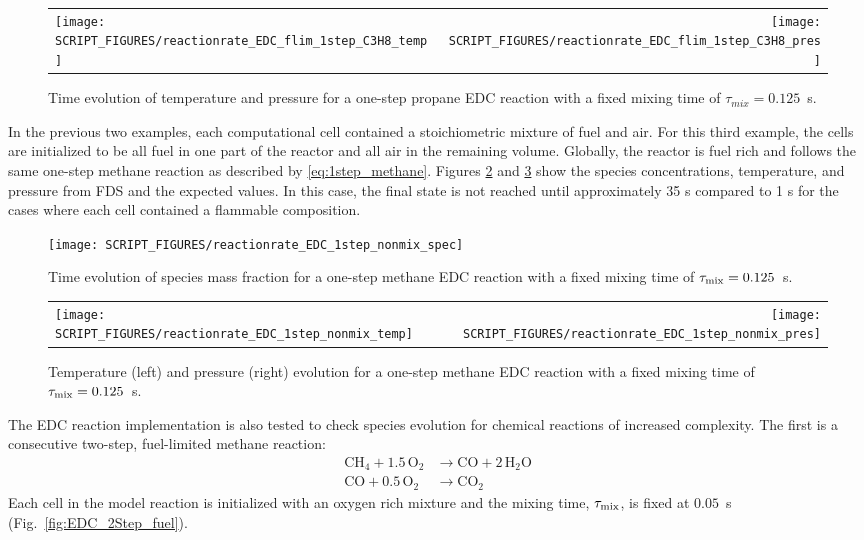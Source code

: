 \documentclass[11pt]{book}
\begin{document}
\begin{figure}[!ht]
\begin{tabular*}{\textwidth}{lr}
\texttt{[image: SCRIPT\_FIGURES/reactionrate\_EDC\_flim\_1step\_C3H8\_temp]} &
\texttt{[image: SCRIPT\_FIGURES/reactionrate\_EDC\_flim\_1step\_C3H8\_pres]}
\end{tabular*}
\caption[Temperature and pressure evolution in a 1-step propane EDC reaction]{Time evolution of temperature and pressure for a one-step propane EDC reaction with a fixed mixing time of $\tau_{mix}=0.125$~s.}
\label{fig:EDC_1Step_prop_temppres}
\end{figure}

In the previous two examples, each computational cell contained a stoichiometric mixture of fuel and air. For this third example, the cells are initialized to be all fuel in one part of the reactor and all air in the remaining volume. Globally, the reactor is fuel rich and follows the same one-step methane reaction as described by \ref{eq:1step_methane}. Figures \ref{fig:EDC_meth_non_spec} and \ref{fig:EDC_meth_non_temppres} show the species concentrations, temperature, and pressure from FDS and the expected values. In this case, the final state is not reached until approximately 35 s compared to 1 s for the cases where each cell contained a flammable composition.

\begin{figure}[!ht]
\centering
\texttt{[image: SCRIPT\_FIGURES/reactionrate\_EDC\_1step\_nonmix\_spec]}
\caption[Species evolution in 1-Step methane EDC reaction]{Time evolution of species mass fraction for a one-step methane EDC reaction with a fixed mixing time of $\tau_{\rm mix}=0.125$~s. }
\label{fig:EDC_meth_non_spec}
\end{figure}

\begin{figure}[!ht]
\begin{tabular*}{\textwidth}{lr}
\texttt{[image: SCRIPT\_FIGURES/reactionrate\_EDC\_1step\_nonmix\_temp]} &
\texttt{[image: SCRIPT\_FIGURES/reactionrate\_EDC\_1step\_nonmix\_pres]}
\end{tabular*}
\caption[Temperature and pressure evolution in a 1-step Methane EDC reaction]{Temperature (left) and pressure (right) evolution for a one-step methane EDC reaction with a fixed mixing time of $\tau_{\rm mix}=0.125$~s.}
\label{fig:EDC_meth_non_temppres}
\end{figure}

The EDC reaction implementation is also tested to check species evolution for chemical reactions of increased complexity. The first is a consecutive two-step, fuel-limited methane reaction:
\begin{align}\label{eq:2step_methane}
\mathrm{CH_4 + 1.5 \, O_2} &\rightarrow  \mathrm{CO + 2 \, H_2O} \\
\nonumber \mathrm{CO + 0.5 \, O_2} &\rightarrow \mathrm{CO_2}
\end{align}
Each cell in the model reaction is initialized with an oxygen rich mixture and the mixing time, $\tau_{\rm mix}$, is fixed at $0.05$~s (Fig.~\ref{fig:EDC_2Step_fuel}).
\end{document}
